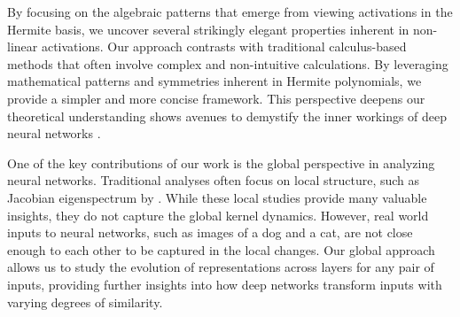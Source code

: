 \documentclass[twoside]{article}
\theoremstyle{definition}
\begin{document}
By focusing on the algebraic patterns that emerge from viewing activations in the Hermite basis, we uncover several strikingly elegant properties inherent in non-linear activations. Our approach contrasts with traditional calculus-based methods that often involve complex and non-intuitive calculations. By leveraging mathematical patterns and symmetries inherent in Hermite polynomials, we provide a simpler and more concise framework. This perspective deepens our theoretical understanding shows avenues to demystify the inner workings of deep neural networks \citep{goodfellow2016deep, lecun2015deep}.



One of the key contributions of our work is the global perspective in analyzing neural networks. Traditional analyses often focus on local structure, such as Jacobian eigenspectrum by \citet{pennington2018emergence}. While these local studies provide many  valuable insights, they do not capture the global kernel dynamics. However, real world inputs to neural networks, such as images of a dog and a cat, are not close enough to each other to be captured in the local changes. Our global approach allows us to study the evolution of representations across layers for any pair of inputs, providing further insights into how deep networks transform inputs with varying degrees of similarity.

\end{document}
